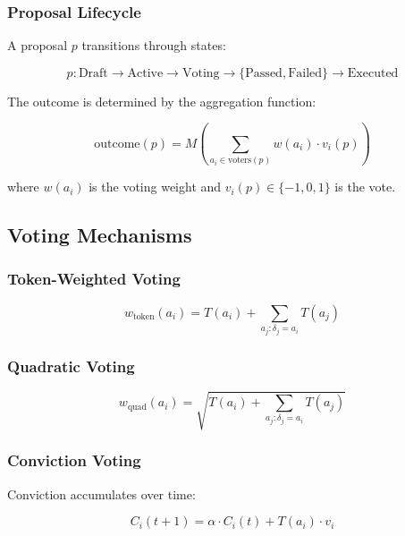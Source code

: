 \subsubsection{Proposal Lifecycle}

A proposal $p$ transitions through states:

\begin{equation}
p: \text{Draft} \rightarrow \text{Active} \rightarrow \text{Voting} \rightarrow \{\text{Passed}, \text{Failed}\} \rightarrow \text{Executed}
\end{equation}

The outcome is determined by the aggregation function:

\begin{equation}
\text{outcome}(p) = M\left(\sum_{a_i \in \text{voters}(p)} w(a_i) \cdot v_i(p)\right)
\end{equation}

where $w(a_i)$ is the voting weight and $v_i(p) \in \{-1, 0, 1\}$ is the vote.

\subsection{Voting Mechanisms}

\subsubsection{Token-Weighted Voting}

\begin{equation}
w_{\text{token}}(a_i) = T(a_i) + \sum_{a_j: \delta_j = a_i} T(a_j)
\end{equation}

\subsubsection{Quadratic Voting}

\begin{equation}
w_{\text{quad}}(a_i) = \sqrt{T(a_i) + \sum_{a_j: \delta_j = a_i} T(a_j)}
\end{equation}

\subsubsection{Conviction Voting}

Conviction accumulates over time:

\begin{equation}
C_i(t+1) = \alpha \cdot C_i(t) + T(a_i) \cdot v_i
\end{equation}

